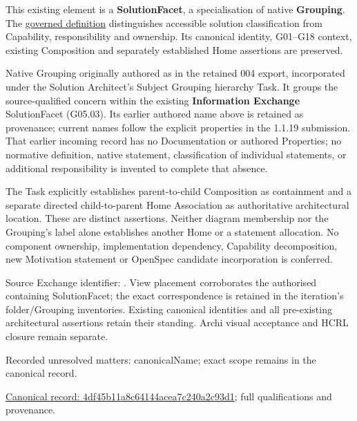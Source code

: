 This existing element is a \textbf{SolutionFacet}, a specialisation of native
\textbf{Grouping}. The \href{\detokenize{../../../../../../../governance/continuum-representation.md#solutionfacet-classification--1119-candidate}}{governed definition}
distinguishes accessible solution classification from Capability, responsibility
and ownership. Its canonical identity, G01–G18 context, existing Composition
and separately established Home assertions are preserved.



Native Grouping originally authored as \texttt{} in the retained 004 export,
incorporated under the Solution Architect's Subject Grouping hierarchy Task.
It groups the source-qualified \texttt{} concern within
the existing \textbf{Information Exchange} SolutionFacet (G05.03). Its earlier authored name above is retained as provenance; current names
follow the explicit properties in the 1.1.19 submission.
That earlier incoming record has no Documentation or authored Properties; no normative
definition, native statement, classification of individual statements, or
additional responsibility is invented to complete that absence.



The Task explicitly establishes parent-to-child Composition as containment and
a separate directed child-to-parent Home Association as authoritative architectural
location. These are distinct assertions. Neither diagram membership nor the
Grouping's label alone establishes another Home or a statement allocation.
No component ownership, implementation dependency, Capability decomposition,
new Motivation statement or OpenSpec candidate incorporation is conferred.



Source Exchange identifier: \texttt{}. View placement corroborates
the authorised containing SolutionFacet; the exact correspondence is retained in the
iteration's folder/Grouping inventories. Existing canonical identities and all
pre-existing architectural assertions retain their standing. Archi visual
acceptance and HCRL closure remain separate.


{\small Recorded unresolved matters: canonicalName; exact scope remains in the canonical record.}\par
{\footnotesize \href{../../../../../../../continuum/grouping/4df45b11a8c64144acea7c240a2c93d1.md}{Canonical record: 4df45b11a8c64144acea7c240a2c93d1}; full qualifications and provenance.}\par

